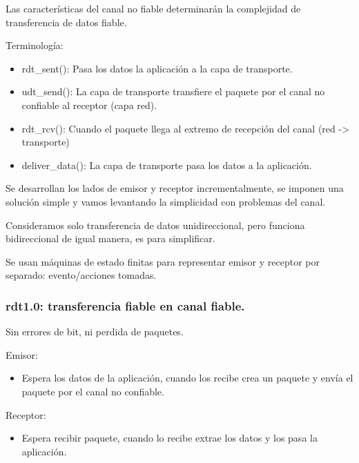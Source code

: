 \documentclass[12pt, twoside, openright]{report} %
\begin{document}
Las características del canal no fiable determinarán la complejidad
de transferencia de datos fiable.

Terminología:

\begin{itemize}
	\item rdt\_sent(): Pasa los datos la aplicación a la capa de transporte.
	\item udt\_send(): La capa de transporte transfiere el paquete por el
	      canal no confiable al receptor (capa red).
	\item rdt\_rcv(): Cuando el paquete llega al extremo de recepción del
	      canal (red -\textgreater{} transporte)
	\item deliver\_data(): La capa de transporte pasa los datos a la
	      aplicación.
\end{itemize}

Se desarrollan los lados de emisor y receptor incrementalmente, se
imponen una solución simple y vamos levantando la simplicidad con
problemas del canal.

Consideramos solo transferencia de datos unidireccional, pero
funciona bidireccional de igual manera, es para simplificar.

Se usan máquinas de estado finitas para representar emisor y
receptor por separado: evento/acciones tomadas.

\subsubsection{rdt1.0: transferencia fiable en canal fiable.}

Sin errores de bit, ni perdida de paquetes.

\begin{figure}[H]
	{\def\svgwidth{.9\textwidth}
		}
\end{figure}

Emisor:

\begin{itemize}
	\item Espera los datos de la aplicación, cuando los recibe crea un
	      paquete y envía el paquete por el canal no confiable.
\end{itemize}

Receptor:

\begin{itemize}
	\item Espera recibir paquete, cuando lo recibe extrae los datos y los
	      pasa la aplicación.
\end{itemize}
\end{document}
